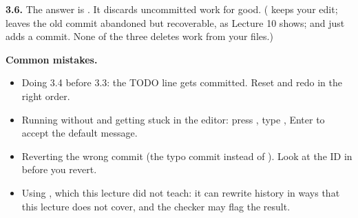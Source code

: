 \textbf{3.6.} The answer is . It discards uncommitted work for good. ( keeps your edit;  leaves the old commit abandoned but recoverable, as Lecture 10 shows; and  just adds a commit. None of the three deletes work from your files.)

\textbf{Common mistakes.}
\begin{itemize}
  \item Doing 3.4 before 3.3: the TODO line gets committed. Reset and redo in the right order.
  \item Running  without  and getting stuck in the editor: press , type , Enter to accept the default message.
  \item Reverting the wrong commit (the typo commit instead of ). Look at the ID in  before you revert.
  \item Using , which this lecture did not teach: it can rewrite history in ways that this lecture does not cover, and the checker may flag the result.
\end{itemize}
